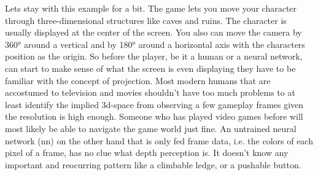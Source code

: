 \documentclass[12pt, letterpaper]{article}
\begin{document}
Lets stay with this example for a bit. The game lets you move your character through three-dimensional structures like caves and ruins. The character is usually displayed at the center of the screen. You also can move the camera by 360° around a vertical and by 180° around a horizontal axis with the characters position as the origin. So before the player, be it a human or a neural network, can start to make sense of what the screen is even displaying they have to be familiar with the concept of projection. Most modern humans that are accostumed to television and movies shouldn't have too much problems to at least identify the implied 3d-space from observing a few gameplay frames given the resolution is high enough. Someone who has played video games before will most likely be able to navigate the game world just fine. An untrained neural network (nn) on the other hand that is only fed frame data, i.e. the colors of each pixel of a frame, has no clue what depth perception is. It doesn't know any important and reocurring pattern like a climbable ledge, or a pushable button.  

\centering
\begin{neuralnetwork} 
\hiddenlayer[count=2]{} 
\outputlayer[count=1]{} 
\end{neuralnetwork}
\end{document}
